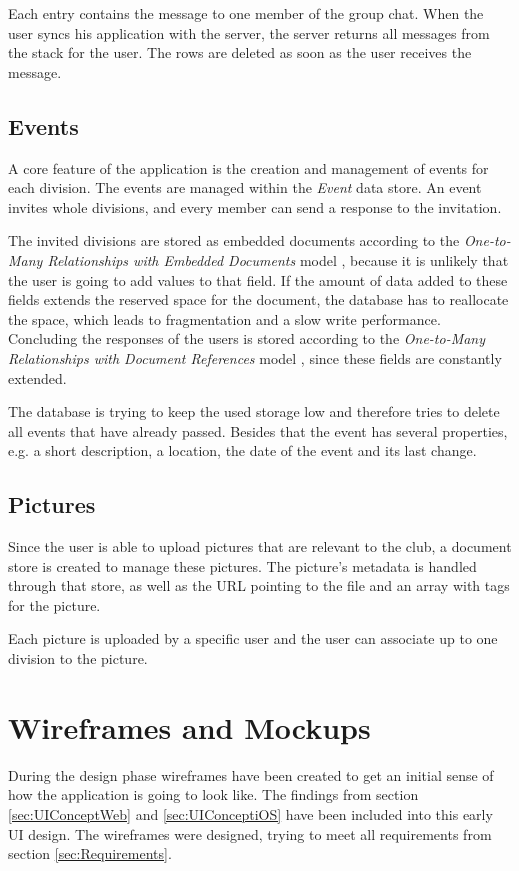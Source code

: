 Each entry contains the message to one member of the group chat. When the user syncs his application with the server, the server returns all messages from the stack for the user. The rows are deleted as soon as the user receives the message. 

\subsection{Events}
A core feature of the application is the creation and management of events for each division. The events are managed within the \emph{Event} data store. An event invites whole divisions, and every member can send a response to the invitation. 

The invited divisions are stored as embedded documents according to the \emph{One-to-Many Relationships with Embedded Documents} model \cite[p. 141]{Mongo:2014aa}, because it is unlikely that the user is going to add values to that field. If the amount of data added to these fields extends the reserved space for the document, the database has to reallocate the space, which leads to fragmentation and a slow write performance. Concluding the responses of the users is stored according to the \emph{One-to-Many Relationships with Document References} model \cite[p. 143]{Mongo:2014aa}, since these fields are constantly extended.

The database is trying to keep the used storage low and therefore tries to delete all events that have already passed. Besides that the event has several properties, e.g. a short description, a location, the date of the event and its last change.

\subsection{Pictures}
Since the user is able to upload pictures that are relevant to the club, a document store is created to manage these pictures. The picture's metadata is handled through that store, as well as the URL pointing to the file and an array with tags for the picture.

Each picture is uploaded by a specific user and the user can associate up to one division to the picture.

\section{Wireframes and Mockups}
\label{sec:Wireframes}

During the design phase wireframes have been created to get an initial sense of how the application is going to look like. The findings from section \vref{sec:UIConceptWeb} and \vref{sec:UIConceptiOS} have been included into this early \gls{UI} design. The wireframes were designed, trying to meet all requirements from section \vref{sec:Requirements}.

